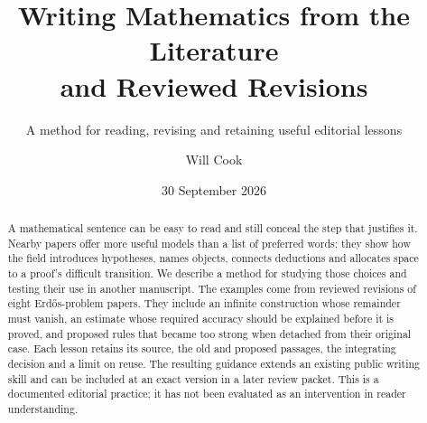 \documentclass[11pt]{article}
\title{Writing Mathematics from the Literature\\and Reviewed Revisions}
\subtitle{A method for reading, revising and retaining useful editorial lessons}
\author{Will Cook}
\date{30 September 2026}
\begin{document}
\maketitle
\paperprovenance
\begin{abstract}
A mathematical sentence can be easy to read and still conceal the step that
justifies it. Nearby papers offer more useful models than a list of preferred
words: they show how the field introduces hypotheses, names objects, connects
deductions and allocates space to a proof's difficult transition. We describe a
method for studying those choices and testing their use in another manuscript.
The examples come from reviewed revisions of eight Erd\H{o}s-problem papers.
They include an infinite construction whose remainder must vanish, an estimate
whose required accuracy should be explained before it is proved, and proposed
rules that became too strong when detached from their original case. Each lesson
retains its source, the old and proposed passages, the integrating decision and
a limit on reuse. The resulting guidance extends an existing public writing
skill and can be included at an exact version in a later review packet. This is
a documented editorial practice; it has not been evaluated as an intervention
in reader understanding.
\end{abstract}





\end{document}
